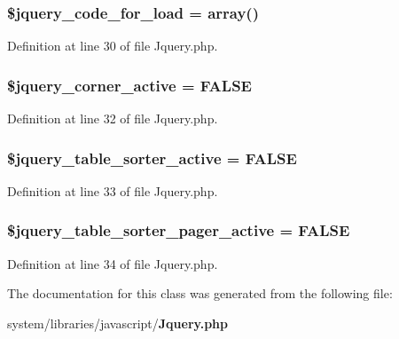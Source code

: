 \subsubsection[{\$jquery\-\_\-code\-\_\-for\-\_\-load}]{\setlength{\rightskip}{0pt plus 5cm}\$jquery\-\_\-code\-\_\-for\-\_\-load = array()}\label{class_c_i___jquery_aae273040292e1e032140a014d38f6f0c}


Definition at line 30 of file Jquery.\-php.

\subsubsection[{\$jquery\-\_\-corner\-\_\-active}]{\setlength{\rightskip}{0pt plus 5cm}\$jquery\-\_\-corner\-\_\-active = F\-A\-L\-S\-E}\label{class_c_i___jquery_a86584cd6fadb4fe08bc8cf65d98da4f3}


Definition at line 32 of file Jquery.\-php.

\subsubsection[{\$jquery\-\_\-table\-\_\-sorter\-\_\-active}]{\setlength{\rightskip}{0pt plus 5cm}\$jquery\-\_\-table\-\_\-sorter\-\_\-active = F\-A\-L\-S\-E}\label{class_c_i___jquery_a29e31c754cf116ca8fb50756b582f3a9}


Definition at line 33 of file Jquery.\-php.

\subsubsection[{\$jquery\-\_\-table\-\_\-sorter\-\_\-pager\-\_\-active}]{\setlength{\rightskip}{0pt plus 5cm}\$jquery\-\_\-table\-\_\-sorter\-\_\-pager\-\_\-active = F\-A\-L\-S\-E}\label{class_c_i___jquery_a43cc145aba3c11e907fb4245f23bc44e}


Definition at line 34 of file Jquery.\-php.



The documentation for this class was generated from the following file\-:\begin{DoxyCompactItemize}
\item 
system/libraries/javascript/{\bf Jquery.\-php}\end{DoxyCompactItemize}
